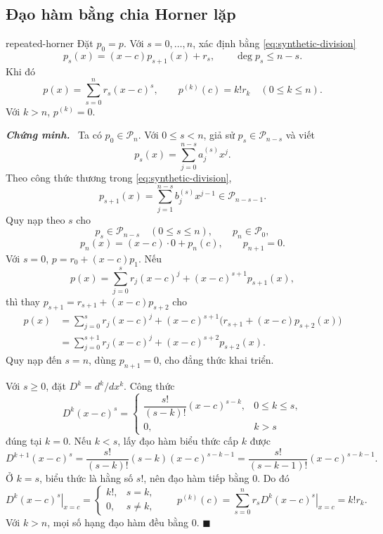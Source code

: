 \documentclass[12pt,a4paper,oneside]{book}
\numberwithin{algorithm}{chapter}
\theoremstyle{definition}
\newenvironment{chungminh}{\par\medskip\noindent\textbf{\textit{\color{mainblue}Chứng minh.}}\ }{\hfill$\blacksquare$\par\medskip}
\begin{document}
\subsection{Đạo hàm bằng chia Horner lặp}
\begin{dinhly}{}{repeated-horner}
Đặt $p_0=p$. Với $s=0,\ldots,n$, xác định bằng \eqref{eq:synthetic-division}
\[
 p_s(x)=(x-c)p_{s+1}(x)+r_s,
 \qquad\deg p_s\leq n-s.
\]
Khi đó
\begin{equation}\label{eq:shifted-expansion}
 p(x)=\sum_{s=0}^{n}r_s(x-c)^s,
 \qquad p^{(k)}(c)=k!r_k\quad(0\leq k\leq n).
\end{equation}
Với $k>n$, $p^{(k)}=0$.
\end{dinhly}
\begin{chungminh}
Ta có $p_0\in\mathcal P_n$. Với $0\leq s<n$, giả sử $p_s\in\mathcal P_{n-s}$ và viết
\[
 p_s(x)=\sum_{j=0}^{n-s}a_j^{(s)}x^j.
\]
Theo công thức thương trong \eqref{eq:synthetic-division},
\[
 p_{s+1}(x)=\sum_{j=1}^{n-s}b_j^{(s)}x^{j-1}\in\mathcal P_{n-s-1}.
\]
Quy nạp theo $s$ cho
\[
 p_s\in\mathcal P_{n-s}\quad(0\leq s\leq n),\qquad p_n\in\mathcal P_0,
\]
\[
 p_n(x)=(x-c)\cdot0+p_n(c),\qquad p_{n+1}=0.
\]
Với $s=0$, $p=r_0+(x-c)p_1$. Nếu
\[
 p(x)=\sum_{j=0}^{s}r_j(x-c)^j+(x-c)^{s+1}p_{s+1}(x),
\]
thì thay $p_{s+1}=r_{s+1}+(x-c)p_{s+2}$ cho
\begin{align*}
 p(x)&=\sum_{j=0}^{s}r_j(x-c)^j
 +(x-c)^{s+1}\bigl(r_{s+1}+(x-c)p_{s+2}(x)\bigr)\\
 &=\sum_{j=0}^{s+1}r_j(x-c)^j+(x-c)^{s+2}p_{s+2}(x).
\end{align*}
Quy nạp đến $s=n$, dùng $p_{n+1}=0$, cho đẳng thức khai triển.

Với $s\geq0$, đặt $D^k=d^k/dx^k$. Công thức
\[
 D^k(x-c)^s=
 \begin{cases}
 \dfrac{s!}{(s-k)!}(x-c)^{s-k},&0\leq k\leq s,\\
 0,&k>s
 \end{cases}
\]
đúng tại $k=0$. Nếu $k<s$, lấy đạo hàm biểu thức cấp $k$ được
\[
 D^{k+1}(x-c)^s
 =\frac{s!}{(s-k)!}(s-k)(x-c)^{s-k-1}
 =\frac{s!}{(s-k-1)!}(x-c)^{s-k-1}.
\]
Ở $k=s$, biểu thức là hằng số $s!$, nên đạo hàm tiếp bằng $0$. Do đó
\[
 \left.D^k(x-c)^s\right|_{x=c}
 =\begin{cases}k!,&s=k,\\0,&s\ne k,\end{cases}
 \qquad
 p^{(k)}(c)=\sum_{s=0}^{n}r_s\left.D^k(x-c)^s\right|_{x=c}=k!r_k.
\]
Với $k>n$, mọi số hạng đạo hàm đều bằng $0$.
\end{chungminh}
\end{document}
